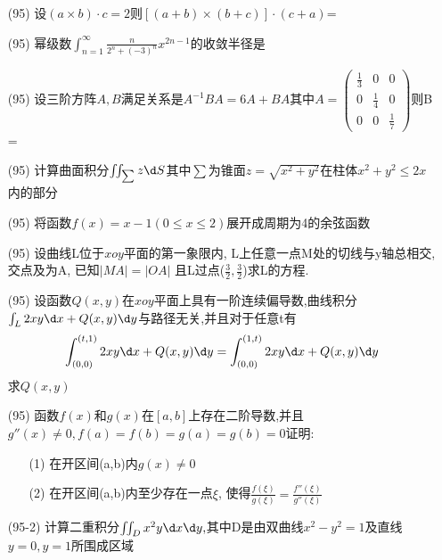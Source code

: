 \documentclass[12pt, a4paper, oneside, UTF8]{ctexbook}
\begin{document}
\begin{enumerate}
    \item [(95)] 设$(a\times b)\cdot c = 2$则$[(a+b)\times (b+c)]\cdot(c+a)$=
    \item [(95)] 幂级数$\int_{n=1}^{\infty}\frac{n}{2^n + (-3)^n}x^{2n-1}$的收敛半径是
    \item [(95)] 设三阶方阵$A,B$满足关系是$A^{-1}BA=6A+BA$其中$A=\begin{pmatrix}
        \frac{1}{3} & 0 & 0 \\
        0 & \frac{1}{4} & 0 \\
        0 & 0 & \frac{1}{7}
    \end{pmatrix}$则B = 
    \item [(95)] 计算曲面积分$\iint_{\sum}z\d S$其中$\sum$为锥面$z=\sqrt{x^2+y^2}$在柱体$x^2+y^2\leq 2x$内的部分
    \item [(95)] 将函数$f(x)=x-1(0\leq x\leq 2)$展开成周期为4的余弦函数
    \item [(95)] 设曲线L位于$xoy$平面的第一象限内, L上任意一点M处的切线与y轴总相交, 交点及为A, 已知$\left|MA\right| = \left|OA\right|$
    且L过点($\frac{3}{2},\frac{3}{2}$)求L的方程.
    \item [(95)] 设函数$Q(x,y)$在$xoy$平面上具有一阶连续偏导数,曲线积分$\int_{L}2xy\d x + Q(x,y)\d y$与路径无关,并且对于任意t有
    $$
    \int_{(0,0)}^{(t, 1)}2xy\d x + Q(x,y)\d y = \int_{(0,0)}^{(1,t)}2xy\d x + Q(x,y)\d y
    $$
    求$Q(x,y)$
    \item [(95)] 函数$f(x)$和$g(x)$在$[a,b]$上存在二阶导数,并且$g''(x)\neq 0, f(a) = f(b) = g(a) = g(b) = 0$证明:
    \begin{enumerate}
        \item [(1)] 在开区间(a,b)内$g(x)\neq 0$
        \item [(2)] 在开区间(a,b)内至少存在一点$\xi$, 使得$\frac{f(\xi)}{g(\xi)}=\frac{f''(\xi)}{g''(\xi)}$
    \end{enumerate}
    \item [(95-2)] 计算二重积分$\iint_{D}x^2y\d x\d y,$其中D是由双曲线$x^2-y^2=1$及直线$y=0,y=1$所围成区域


\end{enumerate}
\end{document}
